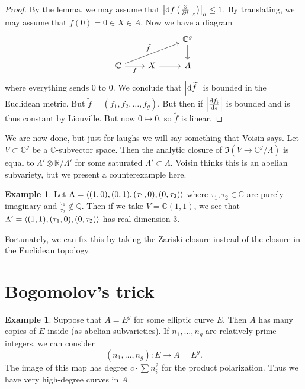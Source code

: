 \documentclass[leqno, openany]{memoir}
\theoremstyle{definition}
\newtheorem{exm}[thm]{Example}
\theoremstyle{remark}
\theoremstyle{plain}
\theoremstyle{definition}
\theoremstyle{remark}
\newcommand{\R}{\mathbb{R}}
\newcommand{\C}{\mathbb{C}}
\newcommand{\Q}{\mathbb{Q}}
\newcommand{\wt}[1]{\widetilde{#1}}
\begin{document}
\begin{proof}
    By the lemma, we may assume that $\abs{\dd{f}\qty(\eval{\pdv{t}}_z)}_h \leq 1$. By translating, we may assume that $f(0) = 0 \in X \in A$. Now we have a diagram
    \begin{equation*}
    \begin{tikzcd}
        & & \C^g \ar{d} \\
        \C \ar{urr}{\wt{f}} \ar[swap]{r}{f} & X \ar{r} & A
    \end{tikzcd}
    \end{equation*}
    where everything sends $0$ to $0$. We conclude that $\abs{\dd{\wt{f}}}$ is bounded in the Euclidean metric. But $\wt{f} = (f_1, f_2, \ldots, f_g)$. But then if $\abs{\dv{f_i}{z}}$ is bounded and is thus constant by Liouville. But now $0 \mapsto 0$, so $\wt{f}$ is linear.
\end{proof}

We are now done, but just for laughs we will say something that Voisin says. Let $V \subset \C^g$ be a $\C$-subvector space. Then the analytic closure of $\Im(V \to \C^g / \Lambda)$ is equal to $\Lambda' \otimes \R/\Lambda'$ for some saturated $\Lambda' \subset \Lambda$. Voisin thinks this is an abelian subvariety, but we present a counterexample here.

\begin{exm}
    Let $\Lambda = \ev{(1,0), (0,1), (\tau_1, 0), (0, \tau_2)}$ where $\tau_1, \tau_2 \in \C$ are purely imaginary and $\frac{\tau_1}{\tau_2} \notin \Q$. Then if we take $V = \C (1,1)$, we see that $\Lambda' = \ev{(1,1), (\tau_1, 0), (0, \tau_2)}$ has real dimension $3$.
\end{exm}

Fortunately, we can fix this by taking the Zariski closure instead of the closure in the Euclidean topology.

\section{Bogomolov's trick}
\begin{exm}
    Suppose that $A = E^g$ for some elliptic curve $E$. Then $A$ has many copies of $E$ inside (as abelian subvarieties). If $n_1, \ldots, n_g$ are relatively prime integers, we can consider
    \[ (n_1, \ldots, n_g) \colon E \to A = E^g. \]
    The image of this map has degree $c \cdot \sum n_i^2$ for the product polarization. Thus we have very high-degree curves in $A$.
\end{exm}
\end{document}
